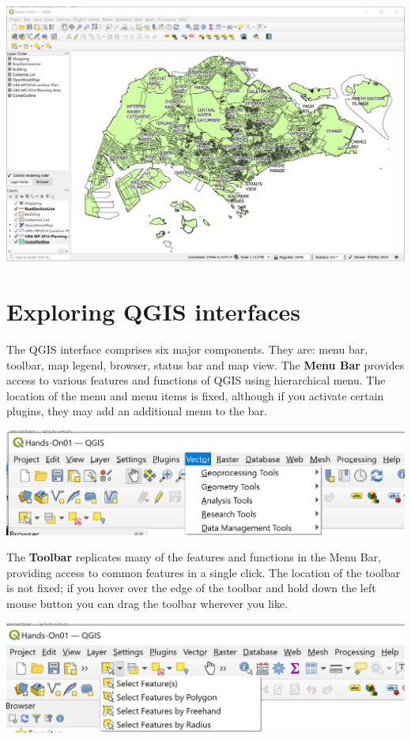 \documentclass[
  letterpaper,
  DIV=11,
  numbers=noendperiod]{scrreprt}
\begin{document}
\includegraphics{./img/image1-7.jpg}

\hypertarget{exploring-qgis-interfaces}{%
\section{Exploring QGIS interfaces}\label{exploring-qgis-interfaces}}

The QGIS interface comprises six major components. They are: menu bar,
toolbar, map legend, browser, status bar and map view. The \textbf{Menu
Bar} provides access to various features and functions of QGIS using
hierarchical menu. The location of the menu and menu items is fixed,
although if you activate certain plugins, they may add an additional
menu to the bar.

\includegraphics{./img/image1-8.jpg}

The \textbf{Toolbar} replicates many of the features and functions in
the Menu Bar, providing access to common features in a single click. The
location of the toolbar is not fixed; if you hover over the edge of the
toolbar and hold down the left mouse button you can drag the toolbar
wherever you like.

\includegraphics{./img/image1-9.jpg}
\end{document}
